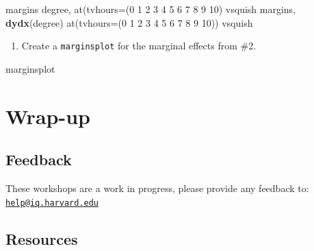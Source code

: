 \documentclass[
]{book}
\newenvironment{Shaded}{\begin{snugshade}}{\end{snugshade}}
\newcommand{\FunctionTok}[1]{\textcolor[rgb]{0.00,0.00,0.00}{#1}}
\newcommand{\KeywordTok}[1]{\textcolor[rgb]{0.13,0.29,0.53}{\textbf{#1}}}
\newcommand{\NormalTok}[1]{#1}
\providecommand{\tightlist}{%
  \setlength{\itemsep}{0pt}\setlength{\parskip}{0pt}}
\begin{document}
\begin{Shaded}
\begin{Highlighting}[]
\NormalTok{margins degree, }\FunctionTok{at}\NormalTok{(tvhours=(0 1 2 3 4 5 6 7 8 9 10) vsquish }
\NormalTok{margins, }\KeywordTok{dydx}\NormalTok{(degree) }\FunctionTok{at}\NormalTok{(tvhours=(0 1 2 3 4 5 6 7 8 9 10)) vsquish }
\end{Highlighting}
\end{Shaded}

\begin{enumerate}
\def\labelenumi{\arabic{enumi}.}
\setcounter{enumi}{2}
\tightlist
\item
  Create a \texttt{marginsplot} for the marginal effects from \#2.
\end{enumerate}

\begin{Shaded}
\begin{Highlighting}[]
\NormalTok{marginsplot}
\end{Highlighting}
\end{Shaded}

\hypertarget{wrap-up-9}{%
\section{Wrap-up}\label{wrap-up-9}}

\hypertarget{feedback-9}{%
\subsection{Feedback}\label{feedback-9}}

These workshops are a work in progress, please provide any feedback to: \href{mailto:help@iq.harvard.edu}{\nolinkurl{help@iq.harvard.edu}}

\hypertarget{resources-12}{%
\subsection{Resources}\label{resources-12}}
\end{document}
